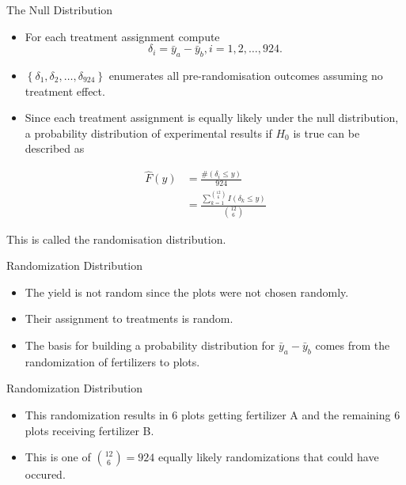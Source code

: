 \documentclass[9pt,ignorenonframetext,]{beamer}
\providecommand{\tightlist}{%
\setlength{\itemsep}{0pt}\setlength{\parskip}{0pt}}
\begin{document}
\begin{frame}{The Null Distribution}

\begin{itemize}
\tightlist
\item
  For each treatment assignment compute
  \[\delta_i={\bar y_a}-{\bar y_b}, i=1,2,\ldots,924.\]
\item
  \(\left\{\delta_1, \delta_2, \ldots, \delta_{924}\right\}\) enumerates
  all pre-randomisation outcomes assuming no treatment effect.
\item
  Since each treatment assignment is equally likely under the null
  distribution, a probability distribution of experimental results if
  \(H_0\) is true can be described as
\end{itemize}

\[\begin{aligned} 
{\hat F}(y) &= \frac{\#(\delta_i \le y)}{924} \\
            &= \frac{\sum_{k=1}^{{\binom{12}{6}}}I({\delta_k \le y})}{\binom{12}{6}}
\end{aligned}\]

This is called the randomisation distribution.

\end{frame}

\begin{frame}{Randomization Distribution}

\begin{itemize}
\item
  The yield is not random since the plots were not chosen randomly.
\item
  Their assignment to treatments is random.
\item
  The basis for building a probability distribution for
  \(\bar{y}_a - \bar{y}_b\) comes from the randomization of fertilizers
  to plots.
\end{itemize}

\end{frame}

\begin{frame}{Randomization Distribution}

\begin{itemize}
\item
  This randomization results in 6 plots getting fertilizer A and the
  remaining 6 plots receiving fertilizer B.
\item
  This is one of \({12 \choose 6} = 924\) equally likely randomizations
  that could have occured.
\end{itemize}

\end{frame}
\end{document}
